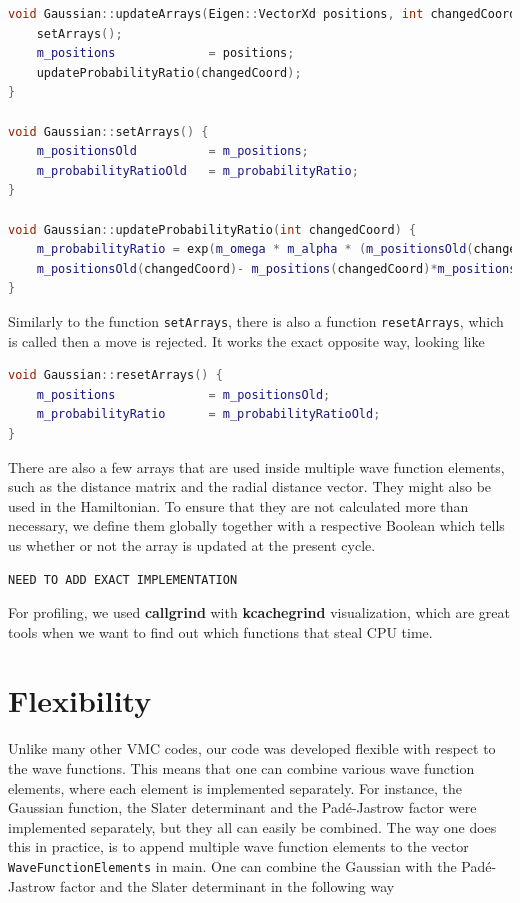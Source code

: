 \lstset{basicstyle=\scriptsize}
\begin{lstlisting}[language=c++,caption={from \texttt{gaussian.cpp}}]
void Gaussian::updateArrays(Eigen::VectorXd positions, int changedCoord) {
    setArrays();
    m_positions             = positions;
    updateProbabilityRatio(changedCoord);
}

void Gaussian::setArrays() {
    m_positionsOld          = m_positions;
    m_probabilityRatioOld   = m_probabilityRatio;
}

void Gaussian::updateProbabilityRatio(int changedCoord) {
    m_probabilityRatio = exp(m_omega * m_alpha * (m_positionsOld(changedCoord) * \
    m_positionsOld(changedCoord)- m_positions(changedCoord)*m_positions(changedCoord)));
}
\end{lstlisting}

Similarly to the function \texttt{setArrays}, there is also a function \texttt{resetArrays}, which is called then a move is rejected. It works the exact opposite way, looking like

\lstset{basicstyle=\scriptsize}
\begin{lstlisting}[language=c++,caption={from \texttt{gaussian.cpp}}]
void Gaussian::resetArrays() {
    m_positions             = m_positionsOld;
    m_probabilityRatio      = m_probabilityRatioOld;
}
\end{lstlisting}

There are also a few arrays that are used inside multiple wave function elements, such as the distance matrix and the radial distance vector. They might also be used in the Hamiltonian. To ensure that they are not calculated more than necessary, we define them globally together with a respective Boolean which tells us whether or not the array is updated at the present cycle. 

\lstset{basicstyle=\scriptsize}
\begin{lstlisting}[language=c++,caption={from \texttt{system.cpp}}]
NEED TO ADD EXACT IMPLEMENTATION
\end{lstlisting}

For profiling, we used \textbf{callgrind} with \textbf{kcachegrind} visualization, which are great tools when we want to find out which functions that steal CPU time.

\section{Flexibility}
Unlike many other VMC codes, our code was developed flexible with respect to the wave functions. This means that one can combine various wave function elements, where each element is implemented separately. For instance, the Gaussian function, the Slater determinant and the Padé-Jastrow factor were implemented separately, but they all can easily be combined. The way one does this in practice, is to append multiple wave function elements to the vector \texttt{WaveFunctionElements} in main. One can combine the Gaussian with the Padé-Jastrow factor and the Slater determinant in the following way

